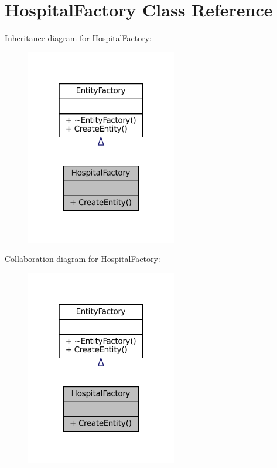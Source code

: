 \hypertarget{classHospitalFactory}{}\section{Hospital\+Factory Class Reference}
\label{classHospitalFactory}


Inheritance diagram for Hospital\+Factory\+:\nopagebreak
\begin{figure}[H]
\begin{center}
\leavevmode
\includegraphics[width=187pt]{classHospitalFactory__inherit__graph}
\end{center}
\end{figure}


Collaboration diagram for Hospital\+Factory\+:\nopagebreak
\begin{figure}[H]
\begin{center}
\leavevmode
\includegraphics[width=187pt]{classHospitalFactory__coll__graph}
\end{center}
\end{figure}
